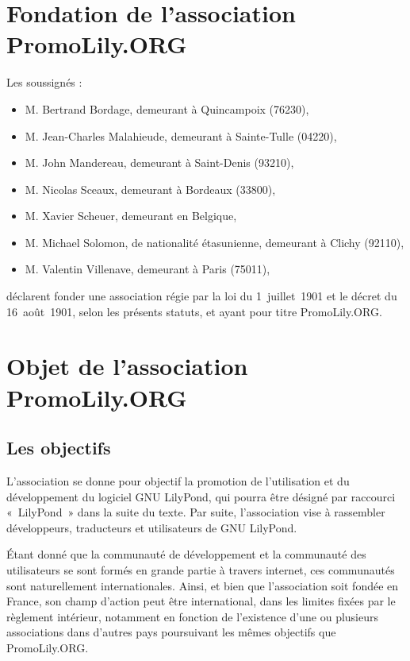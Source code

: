 \documentclass[a4wide,12pt]{scrartcl}
\newcommand{\nomAssoc}{PromoLily.ORG\xspace}
\begin{document}
\section{Fondation de l'association \nomAssoc}

Les soussignés :
\begin{itemize}
\item M. Bertrand Bordage, demeurant à Quincampoix (76230),
\item M. Jean-Charles Malahieude, demeurant à Sainte-Tulle (04220),
\item M. John Mandereau, demeurant à Saint-Denis (93210),
\item M. Nicolas Sceaux, demeurant à Bordeaux (33800),
\item M. Xavier Scheuer, demeurant en Belgique,
\item M. Michael Solomon, de nationalité étasunienne,
  demeurant à Clichy (92110),
\item M. Valentin Villenave, demeurant à Paris (75011),
\end{itemize}
déclarent fonder une association régie par la loi du 1\ier{}~juillet~1901
et le décret du 16~août~1901, selon les présents statuts, et ayant
pour titre \nomAssoc.


\section{Objet de l'association \nomAssoc}

\subsection{Les objectifs}

L'association se donne pour objectif la promotion de l'utilisation et
du développement du logiciel GNU LilyPond, qui pourra être désigné par
raccourci «~LilyPond~» dans la suite du texte. Par suite,
l’association vise à rassembler développeurs, traducteurs et
utilisateurs de GNU LilyPond.

Étant donné que la communauté de développement et la communauté des
utilisateurs se sont formés en grande partie à travers internet, ces
communautés sont naturellement internationales. Ainsi, et bien que
l'association soit fondée en France, son champ d'action peut être
international, dans les limites fixées par le règlement intérieur,
notamment en fonction de l'existence d'une ou plusieurs associations
dans d'autres pays poursuivant les mêmes objectifs que \nomAssoc.
\end{document}
